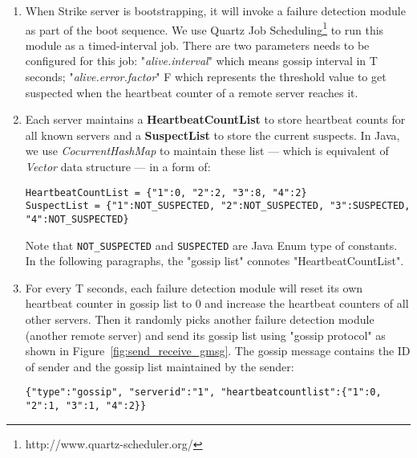 \documentclass[dareport.tex]{subfiles}
\begin{document}
\begin{enumerate}[leftmargin=*]
\item When Strike server is bootstrapping, it will invoke a failure detection module as part of the boot sequence. We use Quartz Job Scheduling\footnote{http://www.quartz-scheduler.org/} to run this module as a timed-interval job. There are two parameters needs to be configured for this job: "\emph{alive.interval}" which means gossip interval in T seconds; "\emph{alive.error.factor}" F which represents the threshold value to get suspected when the heartbeat counter of a remote server reaches it.

\item Each server maintains a \textbf{HeartbeatCountList} to store heartbeat counts for all known servers and a \textbf{SuspectList} to store the current suspects. In Java, we use \emph{CocurrentHashMap} to maintain these list --- which is equivalent of \emph{Vector} data structure --- in a form of:

\begin{small}
\begin{verbatim}
HeartbeatCountList = {"1":0, "2":2, "3":8, "4":2}
SuspectList = {"1":NOT_SUSPECTED, "2":NOT_SUSPECTED, "3":SUSPECTED, "4":NOT_SUSPECTED}
\end{verbatim}
\end{small}



Note that \verb|NOT_SUSPECTED| and \verb|SUSPECTED| are Java Enum type of constants. In the following paragraphs, the "gossip list" connotes "HeartbeatCountList".

\item For every T seconds, each failure detection module will reset its own heartbeat counter in gossip list to 0 and increase the heartbeat counters of all other servers. Then it randomly picks another failure detection module (another remote server) and send its gossip list using "gossip protocol" as shown in Figure~\ref{fig:send_receive_gmsg}. The gossip message contains the ID of sender and the gossip list maintained by the sender:

\begin{small}
\begin{verbatim}
{"type":"gossip", "serverid":"1", "heartbeatcountlist":{"1":0, "2":1, "3":1, "4":2}}
\end{verbatim}
\end{small}


\end{enumerate}
\end{document}
